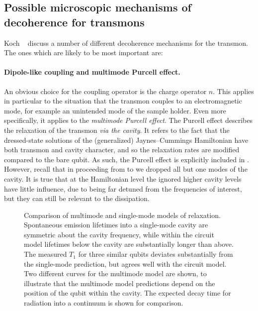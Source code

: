 \subsection{Possible microscopic mechanisms of decoherence for transmons}\label{sec:mmpurcell}
Koch \etal\ \cite{koch_charge-insensitive_2007} discuss a number of different decoherence mechanisms for the transmon. The ones which are likely to be most important are:

\paragraph{Dipole-like coupling and multimode Purcell effect.} An obvious choice for the coupling operator is the charge operator $n$. This applies in particular to the situation that the transmon couples to an electromagnetic mode, for example an unintended mode of the sample holder. Even more specifically, it applies to the \emph{multimode Purcell effect}. The Purcell effect \cite{purcell__1946} describes the relaxation of the transmon \emph{via the cavity}. It refers to the fact that the dressed-state solutions of the (generalized) Jaynes--Cummings Hamiltonian have both transmon and cavity character, and so the relaxation rates are modified compared to the bare qubit. As such, the Purcell effect is explicitly included in .  However, recall that in proceeding from  to  we dropped all but one modes of the cavity. It is true that at the Hamiltonian level the ignored higher cavity levels have little influence, due to being far detuned from the frequencies of interest, but they can still be relevant to the dissipation.
\begin{figure}
 \centering
 \caption[Multimode Purcell effect]{
    Comparison of multimode and single-mode models of relaxation. Spontaneous emission lifetimes into a single-mode cavity are symmetric about the cavity frequency, while within the circuit model lifetimes below the cavity are substantially longer than above. The measured $T_1$ for three similar qubits deviates substantially from the single-mode prediction, but agrees well with the circuit model. Two different curves for the multimode model are shown, to illustrate that the multimode model predictions depend on the position of the qubit within the cavity. The expected decay time for radiation into a continuum is shown for comparison.\label{fig:mmpurcell}}
\end{figure}%
